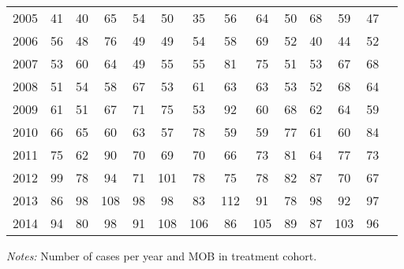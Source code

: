 \begin{table}[H]
\begin{threeparttable}
{\begin{tabular}{l*{13}{c}}
2005        &          41&          40&          65&          54&          50&          35&          56&          64&          50&          68&          59&          47\\
2006        &          56&          48&          76&          49&          49&          54&          58&          69&          52&          40&          44&          52\\
2007        &          53&          60&          64&          49&          55&          55&          81&          75&          51&          53&          67&          68\\
2008        &          51&          54&          58&          67&          53&          61&          63&          63&          53&          52&          68&          64\\
2009        &          61&          51&          67&          71&          75&          53&          92&          60&          68&          62&          64&          59\\
2010        &          66&          65&          60&          63&          57&          78&          59&          59&          77&          61&          60&          84\\
2011        &          75&          62&          90&          70&          69&          70&          66&          73&          81&          64&          77&          73\\
2012        &          99&          78&          94&          71&         101&          78&          75&          78&          82&          87&          70&          67\\
2013        &          86&          98&         108&          98&          98&          83&         112&          91&          78&          98&          92&          97\\
2014        &          94&          80&          98&          91&         108&         106&          86&         105&          89&          87&         103&          96\\
 \bottomrule \end{tabular} } \begin{tablenotes} \item \scriptsize \emph{Notes:} Number of cases per year and MOB in treatment cohort. \end{tablenotes} \end{threeparttable} \end{table} 
